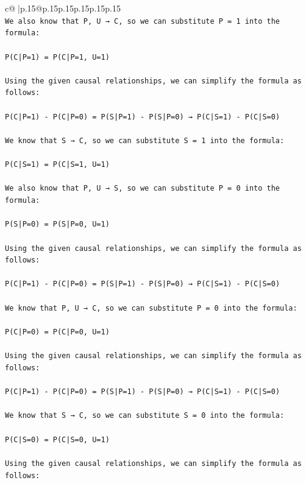 \documentclass{article}
\begin{document}
{\begin{supertabular}{c@{$\;$}|p{.15\linewidth}@{}p{.15\linewidth}p{.15\linewidth}p{.15\linewidth}p{.15\linewidth}p{.15\linewidth}}
{{{\\ 
\texttt{We also know that P, U → C, so we can substitute P = 1 into the formula:} \\
\\ 
\texttt{P(C|P=1) = P(C|P=1, U=1)} \\
\\ 
\texttt{Using the given causal relationships, we can simplify the formula as follows:} \\
\\ 
\texttt{P(C|P=1) {-} P(C|P=0) = P(S|P=1) {-} P(S|P=0) → P(C|S=1) {-} P(C|S=0)} \\
\\ 
\texttt{We know that S → C, so we can substitute S = 1 into the formula:} \\
\\ 
\texttt{P(C|S=1) = P(C|S=1, U=1)} \\
\\ 
\texttt{We also know that P, U → S, so we can substitute P = 0 into the formula:} \\
\\ 
\texttt{P(S|P=0) = P(S|P=0, U=1)} \\
\\ 
\texttt{Using the given causal relationships, we can simplify the formula as follows:} \\
\\ 
\texttt{P(C|P=1) {-} P(C|P=0) = P(S|P=1) {-} P(S|P=0) → P(C|S=1) {-} P(C|S=0)} \\
\\ 
\texttt{We know that P, U → C, so we can substitute P = 0 into the formula:} \\
\\ 
\texttt{P(C|P=0) = P(C|P=0, U=1)} \\
\\ 
\texttt{Using the given causal relationships, we can simplify the formula as follows:} \\
\\ 
\texttt{P(C|P=1) {-} P(C|P=0) = P(S|P=1) {-} P(S|P=0) → P(C|S=1) {-} P(C|S=0)} \\
\\ 
\texttt{We know that S → C, so we can substitute S = 0 into the formula:} \\
\\ 
\texttt{P(C|S=0) = P(C|S=0, U=1)} \\
\\ 
\texttt{Using the given causal relationships, we can simplify the formula as follows:} \\
}}}
\end{supertabular}}
\end{document}
